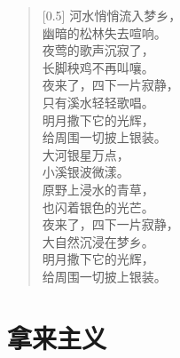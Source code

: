 \documentclass[12pt,UTF-8,openany]{ctexbook}
\begin{document}
\begin{normalsize}
    
    \begin{verse}[0.5\linewidth]
        河水悄悄流入梦乡， \\
        幽暗的松林失去喧响。 \\
        夜莺的歌声沉寂了， \\
        长脚秧鸡不再叫嚷。 \\
        夜来了，四下一片寂静， \\
        只有溪水轻轻歌唱。 \\
        明月撒下它的光辉， \\
        给周围一切披上银装。 \\
        大河银星万点， \\
        小溪银波微漾。 \\
        原野上浸水的青草， \\
        也闪着银色的光芒。 \\
        夜来了，四下一片寂静， \\
        大自然沉浸在梦乡。 \\
        明月撒下它的光辉， \\
        给周围一切披上银装。
    \end{verse}
    
\end{normalsize}



\chapter{拿来主义}
\end{document}
